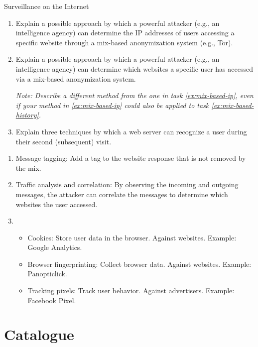 \documentclass{article}
\begin{document}
\begin{exercise}{Surveillance on the Internet}
  \begin{enumerate}
    \item\label{ex:mix-based-ip} Explain a possible approach by which a powerful attacker (e.g., an intelligence agency) can determine the IP addresses of users accessing a specific website through a mix-based anonymization system (e.g., Tor).
    \item\label{ex:mix-based-history}  Explain a possible approach by which a powerful attacker (e.g., an intelligence agency) can determine which websites a specific user has accessed via a mix-based anonymization system.
      \par\textit{Note: Describe a different method from the one in task \ref{ex:mix-based-ip}, even if your method in \ref{ex:mix-based-ip} could also be applied to task \ref{ex:mix-based-history}.}
    \item Explain three techniques by which a web server can recognize a user during their second (subsequent) visit.
  \end{enumerate}

  \begin{solution}
    \begin{enumerate}
      \item Message tagging: Add a tag to the website response that is not removed by the mix.
      \item Traffic analysis and correlation: By observing the incoming and outgoing messages, the attacker can correlate the messages to determine which websites the user accessed.
      \item \begin{itemize}
          \item Cookies: Store user data in the browser. Against websites. Example: Google Analytics.
          \item Browser fingerprinting: Collect browser data. Against websites. Example: Panopticlick.
          \item Tracking pixels: Track user behavior. Against advertisers. Example: Facebook Pixel.
        \end{itemize}
    \end{enumerate}
  \end{solution}
\end{exercise}

\section{Catalogue}
\end{document}
